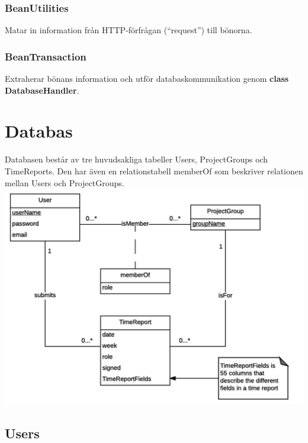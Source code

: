 \documentclass[paper=a4, fontsize=11pt,twoside]{article}
\begin{document}
\subsubsection{BeanUtilities}
Matar in information från HTTP-förfrågan (“request”) till bönorna.

\subsubsection{BeanTransaction}
Extraherar bönans information och utför databaskommunikation genom \textbf{class DatabaseHandler}.

\section{Databas}
Databasen består av tre huvudsakliga tabeller Users, ProjectGroups och TimeReports. Den har även en relationstabell memberOf som beskriver relationen mellan Users och ProjectGroups.
\includegraphics{ERmodel}
\newline
\subsection{Users}
\end{document}
